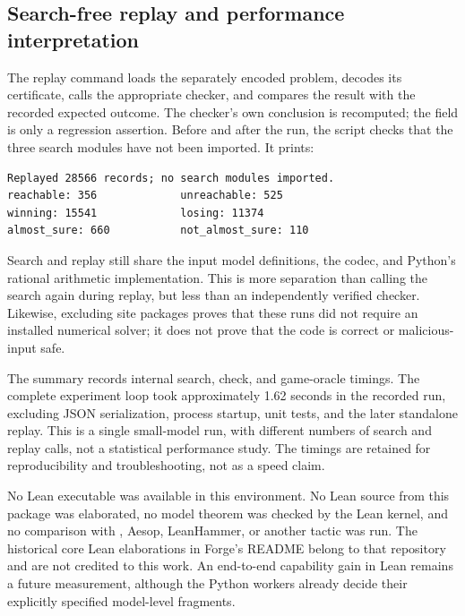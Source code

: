 \subsection{Search-free replay and performance interpretation}
The replay command loads the separately encoded problem, decodes its
certificate, calls the appropriate checker, and compares the result with the
recorded expected outcome. The checker's own conclusion is recomputed; the
 field is only a regression assertion. Before and after the
run, the script checks that the three search modules have not been imported.
It prints:
\begin{lstlisting}
Replayed 28566 records; no search modules imported.
reachable: 356             unreachable: 525
winning: 15541             losing: 11374
almost_sure: 660           not_almost_sure: 110
\end{lstlisting}

Search and replay still share the input model definitions, the codec, and
Python's rational arithmetic implementation. This is more separation than
calling the search again during replay, but less than an independently
verified checker. Likewise, excluding site packages proves that these runs did
not require an installed numerical solver; it does not prove that the code is
correct or malicious-input safe.

The summary records internal search, check, and game-oracle timings. The
complete experiment loop took approximately 1.62 seconds in the recorded run,
excluding JSON serialization, process startup, unit tests, and the later
standalone replay. This is a single small-model run, with different numbers of
search and replay calls, not a statistical performance study. The timings are
retained for reproducibility and troubleshooting, not as a speed claim.

No Lean executable was available in this environment. No Lean source from this
package was elaborated, no model theorem was checked by the Lean kernel, and no
comparison with , Aesop, LeanHammer, or another tactic was run.
The historical core Lean elaborations in Forge's README belong to that
repository and are not credited to this work. An end-to-end capability gain in
Lean remains a future measurement, although the Python workers already decide
their explicitly specified model-level fragments.
